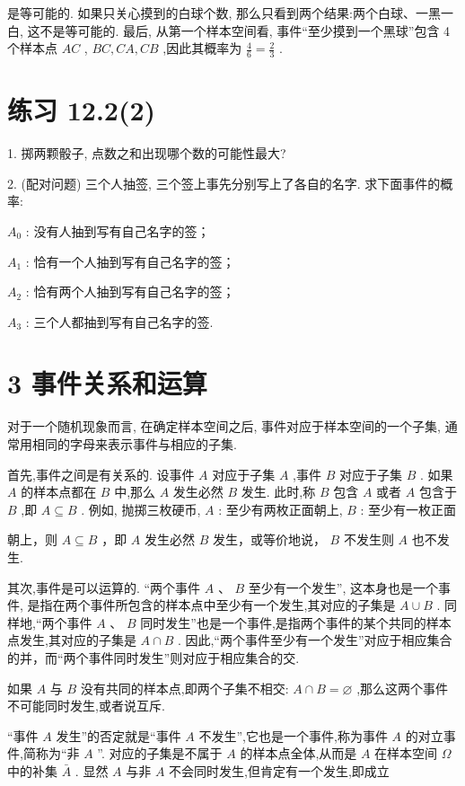 \documentclass[10pt]{article}
\begin{document}
是等可能的. 如果只关心摸到的白球个数, 那么只看到两个结果:两个白球、一黑一白, 这不是等可能的. 最后, 从第一个样本空间看, 事件“至少摸到一个黑球”包含 4 个样本点 \({AC}\) , \({BC},{CA},{CB}\) ,因此其概率为 \(\frac{4}{6} = \frac{2}{3}\) .

\section*{练习 12.2(2)}

1. 掷两颗骰子, 点数之和出现哪个数的可能性最大?

2. (配对问题) 三个人抽签, 三个签上事先分别写上了各自的名字. 求下面事件的概率:

\({A}_{0}\) : 没有人抽到写有自己名字的签；

\({A}_{1}\) : 恰有一个人抽到写有自己名字的签；

\({A}_{2}\) : 恰有两个人抽到写有自己名字的签；

\({A}_{3}\) : 三个人都抽到写有自己名字的签.

\section*{3 事件关系和运算}

对于一个随机现象而言, 在确定样本空间之后, 事件对应于样本空间的一个子集, 通常用相同的字母来表示事件与相应的子集.

首先,事件之间是有关系的. 设事件 \(A\) 对应于子集 \(A\) ,事件 \(B\) 对应于子集 \(B\) . 如果 \(A\) 的样本点都在 \(B\) 中,那么 \(A\) 发生必然 \(B\) 发生. 此时,称 \(B\) 包含 \(A\) 或者 \(A\) 包含于 \(B\) ,即 \(A \subseteq  B\) . 例如, 抛掷三枚硬币, \(A\) : 至少有两枚正面朝上, \(B\) : 至少有一枚正面

朝上，则 \(A \subseteq  B\) ，即 \(A\) 发生必然 \(B\) 发生，或等价地说， \(B\) 不发生则 \(A\) 也不发生.

其次,事件是可以运算的. “两个事件 \(A\text{ 、 }B\) 至少有一个发生”, 这本身也是一个事件, 是指在两个事件所包含的样本点中至少有一个发生,其对应的子集是 \(A \cup  B\) . 同样地,“两个事件 \(A\text{ 、 }B\) 同时发生”也是一个事件,是指两个事件的某个共同的样本点发生,其对应的子集是 \(A \cap  B\) . 因此,“两个事件至少有一个发生”对应于相应集合的并，而“两个事件同时发生”则对应于相应集合的交.

如果 \(A\) 与 \(B\) 没有共同的样本点,即两个子集不相交: \(A \cap  B = \varnothing\) ,那么这两个事件不可能同时发生,或者说互斥.

“事件 \(A\) 发生”的否定就是“事件 \(A\) 不发生”,它也是一个事件,称为事件 \(A\) 的对立事件,简称为“非 \(A\) ”. 对应的子集是不属于 \(A\) 的样本点全体,从而是 \(A\) 在样本空间 \(\Omega\) 中的补集 \(\bar{A}\) . 显然 \(A\) 与非 \(A\) 不会同时发生,但肯定有一个发生,即成立
\end{document}
